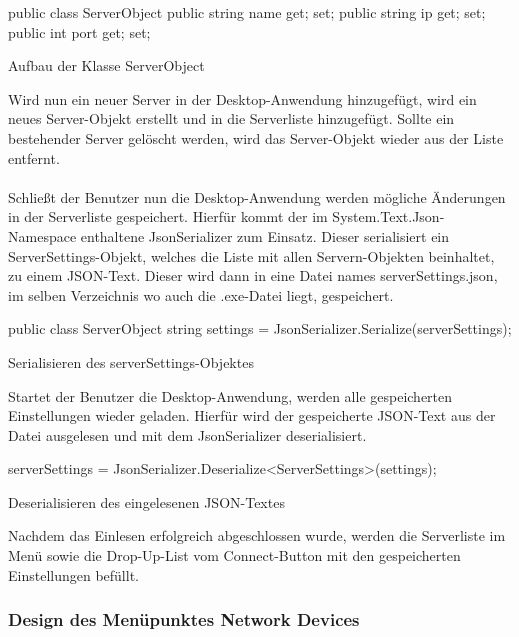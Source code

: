 \begin{program}[H]
\begin{CSharpCode}
public class ServerObject
{
    public string name { get; set; }
    public string ip { get; set; }
    public int port { get; set; }
}
\end{CSharpCode}
\caption{Aufbau der Klasse ServerObject}
\end{program}
\noindent
Wird nun ein neuer Server in der Desktop-Anwendung hinzugefügt, wird ein neues Server-Objekt erstellt und in die Serverliste hinzugefügt. Sollte ein bestehender Server gelöscht werden, wird das Server-Objekt wieder aus der Liste entfernt.
\\ \ \\
Schließt der Benutzer nun die Desktop-Anwendung werden mögliche Änderungen in der Serverliste gespeichert. Hierfür kommt der im System.Text.Json-Namespace enthaltene JsonSerializer zum Einsatz. Dieser serialisiert ein ServerSettings-Objekt, welches die Liste mit allen Servern-Objekten beinhaltet, zu einem JSON-Text. Dieser wird dann in eine Datei names serverSettings.json, im selben Verzeichnis wo auch die .exe-Datei liegt, gespeichert.

\begin{program}[H]
\begin{CSharpCode}
public class ServerObject
string settings = JsonSerializer.Serialize(serverSettings);
\end{CSharpCode}
\caption{Serialisieren des serverSettings-Objektes}
\end{program}
\noindent
Startet der Benutzer die Desktop-Anwendung, werden alle gespeicherten Einstellungen wieder geladen. Hierfür wird der gespeicherte JSON-Text aus der Datei ausgelesen und mit dem JsonSerializer deserialisiert.

\begin{program}[H]
\begin{CSharpCode}
serverSettings = JsonSerializer.Deserialize<ServerSettings>(settings);
\end{CSharpCode}
\caption{Deserialisieren des eingelesenen JSON-Textes}
\end{program}
\noindent
Nachdem das Einlesen erfolgreich abgeschlossen wurde, werden die Serverliste im Menü sowie die Drop-Up-List vom Connect-Button mit den gespeicherten Einstellungen befüllt.

\subsubsection{Design des Menüpunktes Network Devices}

